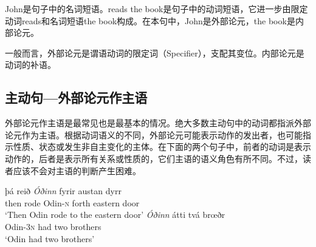 John是句子中的名词短语。reads the book是句子中的动词短语，它进一步由限定动词reads和名词短语the book构成。在本句中，John是外部论元，the book是内部论元。

一般而言，外部论元是谓语动词的限定词（Specifier），支配其变位。内部论元是动词的补语。
\subsection{主动句—外部论元作主语}
外部论元作主语是最常见也是最基本的情况。绝大多数主动句中的动词都指派外部论元作为主语。根据动词语义的不同，外部论元可能表示动作的发出者，也可能指示性质、状态或发生非自主变化的主体。在下面的两个句子中，前者的动词是表示动作的，后者是表示所有关系或性质的，它们主语的语义角色有所不同。不过，读者应该不会对主语的判断产生困难。
\begin{exe}
\ex
\gll    þá	reið	\textit{Óðinn}	fyrir	austan	dyrr\\
then	rode	Odin-\textsc{n}	forth	eastern	door\\
\trans `Then Odin rode to the eastern door’
\ex
\gll \textit{Óðinn}	átti	tvá	brœðr\\
Odin-{\footnotesize 3}\textsc{n}	had	two	brothers\\
\trans `Odin had two brothers’
\end{exe}

